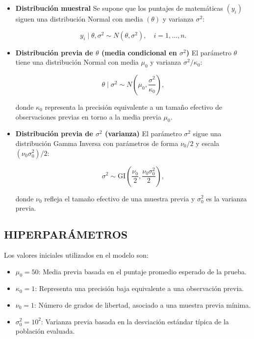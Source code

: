 \documentclass[12pt]{article}
\begin{document}
\begin{itemize}
    \item \textbf{Distribución muestral}  
   Se supone que los puntajes de matemáticas $(y_i)$ siguen una distribución Normal con media $(\theta)$ y varianza $\sigma^2$:  
   
   $$
   y_i \mid \theta, \sigma^2 \sim N(\theta, \sigma^2), \quad i = 1, \dots, n.
   $$

    \item  \textbf{Distribución previa de $\theta$ (media condicional en $\sigma^2$)}  
   El parámetro $\theta$ tiene una distribución Normal con media $\mu_0$ y varianza $\sigma^2 / \kappa_0$:  
   
   $$
   \theta \mid \sigma^2 \sim N\left(\mu_0, \frac{\sigma^2}{\kappa_0}\right),
   $$
   
   donde $\kappa_0$ representa la precisión equivalente a un tamaño efectivo de observaciones previas en torno a la media previa $\mu_0$.

    \item \textbf{Distribución previa de  $\sigma^2$ (varianza)}  
   El parámetro $\sigma^2$ sigue una distribución Gamma Inversa con parámetros de forma $\nu_0 / 2$ y escala $(\nu_0 \sigma_0^2) / 2$:  
   
   $$
   \sigma^2 \sim \text{GI}\left(\frac{\nu_0}{2}, \frac{\nu_0 \sigma_0^2}{2}\right),
   $$
   
   donde $\nu_0$ refleja el tamaño efectivo de una muestra previa y $\sigma_0^2$ es la varianza previa.
\end{itemize}

\subsection{HIPERPARÁMETROS}

Los valores iniciales utilizados en el modelo son:  

\begin{itemize}
    \item $\mu_0 = 50$: Media previa basada en el puntaje promedio esperado de la prueba.  
    \item $\kappa_0 = 1$: Representa una precisión baja equivalente a una observación previa.  
    \item $\nu_0 = 1$: Número de grados de libertad, asociado a una muestra previa mínima.  
    \item $\sigma_0^2 = 10^2$: Varianza previa basada en la desviación estándar típica de la población evaluada.  
\end{itemize}
\end{document}
